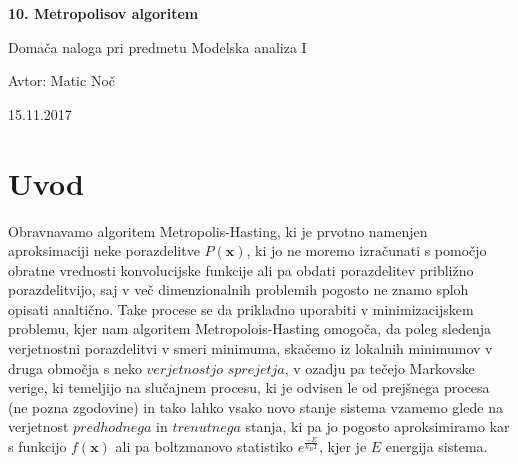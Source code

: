 \documentclass[11pt, a4paper]{article}
\renewcommand{\vec}[1]{\mathbf{#1}}
\begin{document}
    \begin{center}
    {\LARGE\bfseries 10. Metropolisov algoritem\par}
    \vspace{1cm}
    
    {\Large Domača naloga pri predmetu Modelska analiza I\par}
    \vspace{0.2cm}
    {\normalsize Avtor: Matic Noč \par}
    \vspace{0.2cm}    
    {\normalsize 15.11.2017 \par}    

    
    \end{center}
\section{Uvod}
Obravnavamo algoritem Metropolis-Hasting, ki je prvotno namenjen aproksimaciji neke porazdelitve $P(\vec{x})$, ki jo ne moremo izračunati s pomočjo obratne vrednosti konvolucijske funkcije ali pa obdati porazdelitev približno porazdelitvijo, saj v več dimenzionalnih problemih pogosto ne znamo sploh opisati analtično. Take procese se da prikladno uporabiti v minimizacijskem problemu, kjer nam algoritem Metropolois-Hasting omogoča, da poleg sledenja verjetnostni porazdelitvi v smeri minimuma, skačemo iz lokalnih minimumov v druga območja s neko $verjetnostjo$ $sprejetja$, v ozadju pa tečejo Markovske verige, ki temeljijo na slučajnem procesu, ki je odvisen le od prejšnega procesa (ne pozna zgodovine) in tako lahko vsako novo stanje sistema vzamemo glede na verjetnost $predhodnega$ in $trenutnega$ stanja, ki pa jo pogosto aproksimiramo kar s funkcijo $f(\vec{x})$ ali pa boltzmanovo statistiko $e^{\frac{-E}{k_B T}}$, kjer je $E$ energija sistema.
\end{document}
